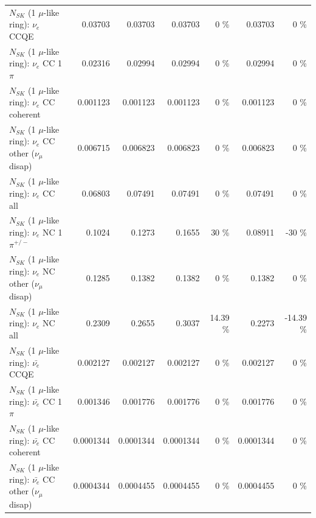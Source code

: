 \begin{table}
\begin{tabular}{| l | r | r | r  r | r  r |}
\hline
\hline
\hline
                                      $N_{SK}$ (1 $\mu$-like ring): $\nu_e$ CCQE &         0.03703 &         0.03703 &         0.03703 &        0 \%  &         0.03703 &        0 \%  \\ 
                                 $N_{SK}$ (1 $\mu$-like ring): $\nu_e$ CC 1$\pi$ &         0.02316 &         0.02994 &         0.02994 &        0 \%  &         0.02994 &        0 \%  \\ 
                               $N_{SK}$ (1 $\mu$-like ring): $\nu_e$ CC coherent &        0.001123 &        0.001123 &        0.001123 &        0 \%  &        0.001123 &        0 \%  \\ 
                $N_{SK}$ (1 $\mu$-like ring): $\nu_e$ CC other ($\nu_\mu$ disap) &        0.006715 &        0.006823 &        0.006823 &        0 \%  &        0.006823 &        0 \%  \\ 
                                  $N_{SK}$ (1 $\mu$-like ring): $\nu_{e}$ CC all &         0.06803 &         0.07491 &         0.07491 &        0 \%  &         0.07491 &        0 \%  \\ 
\hline
                           $N_{SK}$ (1 $\mu$-like ring): $\nu_e$ NC 1$\pi^{+/-}$ &          0.1024 &          0.1273 &          0.1655 &       30 \%  &         0.08911 &      -30 \%  \\ 
                $N_{SK}$ (1 $\mu$-like ring): $\nu_e$ NC other ($\nu_\mu$ disap) &          0.1285 &          0.1382 &          0.1382 &        0 \%  &          0.1382 &        0 \%  \\ 
                                  $N_{SK}$ (1 $\mu$-like ring): $\nu_{e}$ NC all &          0.2309 &          0.2655 &          0.3037 &    14.39 \%  &          0.2273 &   -14.39 \%  \\ 
\hline
\hline
\hline
                                $N_{SK}$ (1 $\mu$-like ring): $\bar{\nu_e}$ CCQE &        0.002127 &        0.002127 &        0.002127 &        0 \%  &        0.002127 &        0 \%  \\ 
                           $N_{SK}$ (1 $\mu$-like ring): $\bar{\nu_e}$ CC 1$\pi$ &        0.001346 &        0.001776 &        0.001776 &        0 \%  &        0.001776 &        0 \%  \\ 
                         $N_{SK}$ (1 $\mu$-like ring): $\bar{\nu_e}$ CC coherent &       0.0001344 &       0.0001344 &       0.0001344 &        0 \%  &       0.0001344 &        0 \%  \\ 
          $N_{SK}$ (1 $\mu$-like ring): $\bar{\nu_e}$ CC other ($\nu_\mu$ disap) &       0.0004344 &       0.0004455 &       0.0004455 &        0 \%  &       0.0004455 &        0 \%  \\ 

\end{tabular}
\end{table}
